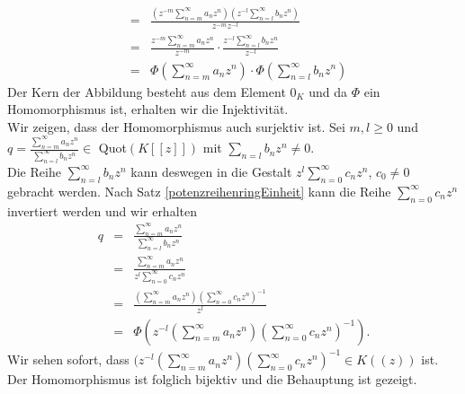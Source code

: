 {\begin{eqnarray*}
&=& \frac{\left(z^{-m}\sum_{n=m}^{\infty}a_n z^n\right)\left(z^{-l}\sum_{n=l}^{\infty}b_n z^n\right)}{z^{-m}z^{-l}}  \\
&=& \frac{z^{-m}\sum_{n=m}^{\infty}a_n z^n}{z^{-m}} \cdot \frac{z^{-l}\sum_{n=l}^{\infty}b_n z^n}{z^{-l}}\\
&=& \Phi \left(\sum_{n=m}^{\infty} a_nz^n\right) \cdot \Phi\left(\sum_{n=l}^{\infty} b_nz^n \right)
\end{eqnarray*}
Der Kern der Abbildung besteht aus dem Element $0_K$ und da $\Phi$ ein Homomorphismus ist, erhalten wir die Injektivität.\\
Wir zeigen, dass der Homomorphismus auch surjektiv ist. Sei $m,l \geq 0$ und $q = \frac{{\sum_{n=m}^{\infty} a_nz^n}}{{\sum_{n=l}^{\infty} b_nz^n}} \in$ Quot$\left(K[[z]]\right)$ mit $\sum_{n=l} b_nz^n \neq 0$. \\
Die Reihe $\sum_{n = l}^{\infty} b_nz^n $ kann deswegen in die Gestalt $z^l\sum_{n = 0}^{\infty} c_nz^n $, $c_0 \neq 0$ gebracht werden. Nach Satz \ref{potenzreihenringEinheit} kann die Reihe $\sum_{n = 0}^{\infty} c_nz^n $ invertiert werden und wir erhalten
\begin{eqnarray*}
q &=& \frac{{\sum_{n=m}^{\infty} a_nz^n}}{{\sum_{n=l}^{\infty} b_nz^n}} \\
&=& \frac{{\sum_{n=m}^{\infty} a_nz^n}}{z^l\sum_{n = 0}^{\infty} c_nz^n } \\
&=& \frac{\left(\sum_{n = m}^{\infty} a_nz^n\right)\left( \sum_{n = 0}^{\infty} c_nz^n\right)^{-1}}{{z^l}}\\
&=& \Phi\left(z^{-l}\left(\sum_{n = m}^{\infty} a_nz^n\right)\left(\sum_{n = 0}^{\infty} c_nz^n\right)^{-1}\right).
\end{eqnarray*}
%
Wir sehen sofort, dass $(z^{-l}\left(\sum_{n = m}^{\infty} a_nz^n\right)\left(\sum_{n = 0}^{\infty} c_nz^n\right)^{-1} \in K((z))$ ist. Der Homomorphismus ist folglich bijektiv und die Behauptung ist gezeigt. 
}
%
%

